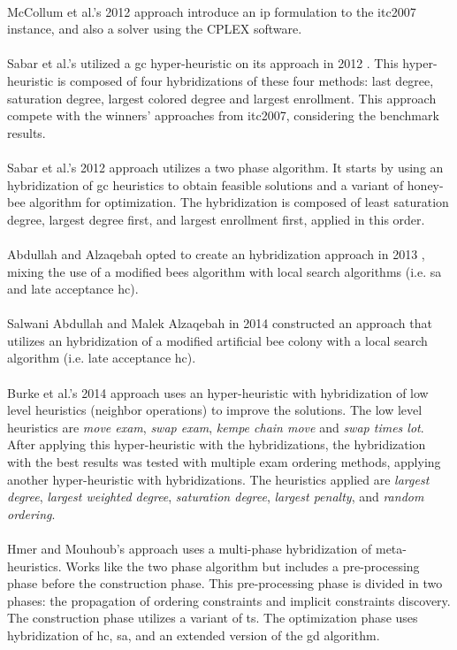\\
McCollum et al.'s 2012 approach \cite{McCollum2012} introduce an \gls{ip} formulation to the \gls{itc2007} instance, and also a solver using the CPLEX software.\\
\\
Sabar et al.'s utilized a \gls{gc} hyper-heuristic on its approach in 2012 \cite{Sabar2012}. This hyper-heuristic is composed of four hybridizations of these four methods: last degree, saturation degree, largest colored degree and largest enrollment. This approach compete with the winners' approaches from \gls{itc2007}, considering the benchmark results.\\
\\
Sabar et al.'s 2012 approach \cite{Sabar2012a} utilizes a two phase algorithm. It starts by using an hybridization of \gls{gc} heuristics to obtain feasible solutions and a variant of honey-bee algorithm for optimization. The hybridization is composed of least saturation degree, largest degree first, and largest enrollment first, applied in this order.\\
\\
Abdullah and Alzaqebah opted to create an hybridization approach in 2013 \cite{Abdullah2013}, mixing the use of a modified bees algorithm with local search algorithms (i.e. \gls{sa} and late acceptance \gls{hc}).\\
\\
Salwani Abdullah and Malek Alzaqebah in 2014 constructed an approach \cite{Alzaqebah2014} that utilizes an hybridization of a modified artificial bee colony with a local search algorithm (i.e. late acceptance \gls{hc}).\\
\\
Burke et al.'s 2014 approach \cite{Burke2014} uses an hyper-heuristic with hybridization of low level heuristics (neighbor operations) to improve the solutions. The low level heuristics are \textit{move exam}, \textit{swap exam}, \textit{kempe chain move} and \textit{swap times lot}. After applying this hyper-heuristic with the hybridizations, the hybridization with the best results was tested with multiple exam ordering methods, applying another hyper-heuristic with hybridizations. The heuristics applied are \textit{largest degree}, \textit{largest weighted degree}, \textit{saturation degree}, \textit{largest penalty}, and \textit{random ordering}.\\
\\
Hmer and Mouhoub's approach \cite{Mouhoub2014} uses a multi-phase hybridization of meta-heuristics. Works like the two phase algorithm but includes a pre-processing phase before the construction phase. This pre-processing phase is divided in two phases: the propagation of ordering constraints and implicit constraints discovery. The construction phase utilizes a variant of \gls{ts}. The optimization phase uses hybridization of \gls{hc}, \gls{sa}, and an extended version of the \gls{gd} algorithm.\\
